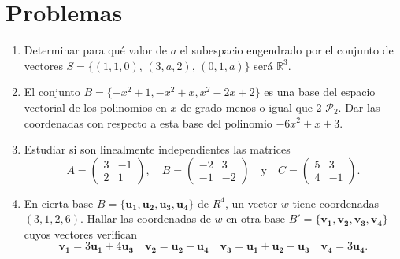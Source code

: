 \documentclass[a4paper]{article}
\begin{document}
\section*{Problemas}
\begin{enumerate}[leftmargin=*]

\item  Determinar para qué valor de $a$ el subespacio engendrado por el
conjunto de vectores $S=\{(1,1,0)$, $(3,a,2)$, $(0,1,a)\}$ será
$\mathbb{R}^{3}$.

\item El conjunto $B=\{-x^2+1,-x^2+x,x^2-2x+2\}$ es una base del espacio vectorial de los polinomios en $x$ de grado menos o igual que 2 $\mathcal{P}_2$. Dar las coordenadas con respecto a esta base del polinomio $-6x^2+x+3$. 

\item  Estudiar si son linealmente independientes las matrices
\[
A=\left(
\begin{array}{rr}
3 & -1 \\ 2 & 1
\end{array}
\right) ,\quad B=\left(
\begin{array}{rr}
-2 & 3 \\ -1 & -2
\end{array}
\right)\quad \mbox{y}\quad C=\left(
\begin{array}{rr}
5 & 3 \\ 4 & -1
\end{array}
\right) .
\]


\item En cierta base $B=\{\mathbf{u_1},\mathbf{u_2},\mathbf{u_3},\mathbf{u_4}\}$ de $R^4$, un vector $w$ tiene coordenadas $(3,1,2,6)$. Hallar las coordenadas de $w$ en otra base $B'=\{\mathbf{v_1},\mathbf{v_2},\mathbf{v_3},\mathbf{v_4}\}$ cuyos vectores verifican
\[
\mathbf{v_1}=3\mathbf{u_1}+4\mathbf{u_3} \quad \mathbf{v_2}=\mathbf{u_2}-\mathbf{u_4} \quad \mathbf{v_3}=\mathbf{u_1}+\mathbf{u_2}+\mathbf{u_3} \quad \mathbf{v_4}=3\mathbf{u_4}.
\]
\end{enumerate}


  
\end{document}
